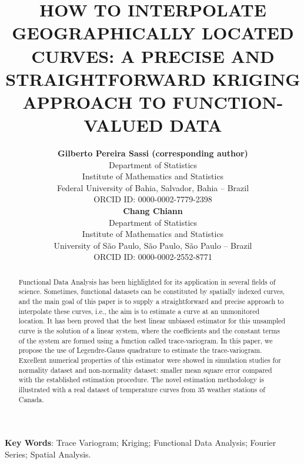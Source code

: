 \documentclass[
  12pt,
]{article}
\author{}
\date{\vspace{-2.5em}}
\theoremstyle{definition}
\theoremstyle{definition}
\theoremstyle{definition}
\theoremstyle{remark}
\begin{document}
\title{HOW TO INTERPOLATE GEOGRAPHICALLY LOCATED CURVES: A PRECISE AND STRAIGHTFORWARD KRIGING APPROACH TO FUNCTION-VALUED DATA}
\author{{\bf Gilberto Pereira Sassi (corresponding author)} \\
    Department of Statistics\\
    Institute of Mathematics and Statistics\\
    Federal University of Bahia, Salvador, Bahia -- Brazil\\
    ORCID ID: 0000-0002-7779-2398 \\
    {\bf Chang Chiann}\\
    Department of Statistics\\
    Institute of Mathematics and Statistics\\
  University of S\~{a}o Paulo, S\~{a}o Paulo, S\~{a}o Paulo -- Brazil\\
  ORCID ID: 0000-0002-2552-8771}
\date{}

\maketitle

\newpage

\begin{abstract}
Functional Data Analysis has been highlighted for its application in several fields of science. Sometimes, functional datasets can be constituted by spatially indexed curves, and the main goal of this paper is to supply a straightforward and precise approach to interpolate these curves, i.e., the aim is to estimate a curve at an unmonitored  location. It has been proved that the best linear unbiased estimator for this unsampled curve is the solution of a linear system, where the coefficients and the constant terms of the system are formed using a function called trace-variogram. In this paper, we propose the use of Legendre-Gauss quadrature to estimate the trace-variogram. Excellent numerical properties of this estimator were showed in simulation studies for normality dataset and non-normality dataset: smaller mean square error compared with the established estimation procedure. The novel estimation methodology is illustrated with a real dataset of temperature curves from 35 weather stations of Canada.
\end{abstract}

\vskip 3mm

\noindent \textbf{Key Words}: Trace Variogram; Kriging; Functional Data Analysis; Fourier Series; Spatial Analysis.
\vskip 3mm
\end{document}
